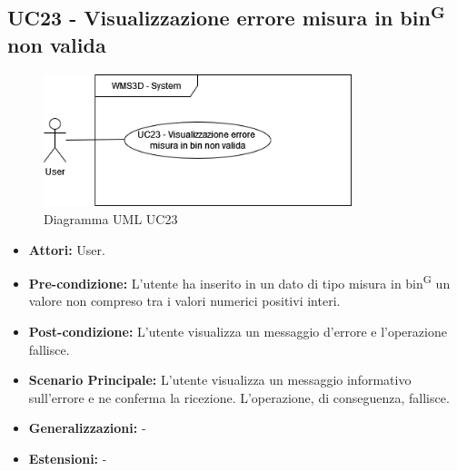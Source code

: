 \subsection{UC23 - Visualizzazione errore misura in bin\textsuperscript{G} non valida}
\begin{figure}[H]
  \centering
  \includegraphics[width=0.8\textwidth]{UC_diagrams_21-26/UC23.drawio.png}
   \caption{Diagramma UML UC23}
\end{figure}
\begin{itemize}
    \item \textbf{Attori:} User.
    \item \textbf{Pre-condizione:}  L'utente ha inserito in un dato di tipo misura in bin\textsuperscript{G} un valore non compreso tra i valori numerici positivi interi.
    \item \textbf{Post-condizione:} L'utente visualizza un messaggio d'errore e l'operazione fallisce.
    \item \textbf{Scenario Principale:}  L'utente visualizza un messaggio informativo sull'errore e ne conferma la ricezione. L'operazione, di conseguenza, fallisce.
    \item \textbf{Generalizzazioni:} -
    \item \textbf{Estensioni:} -
\end{itemize}